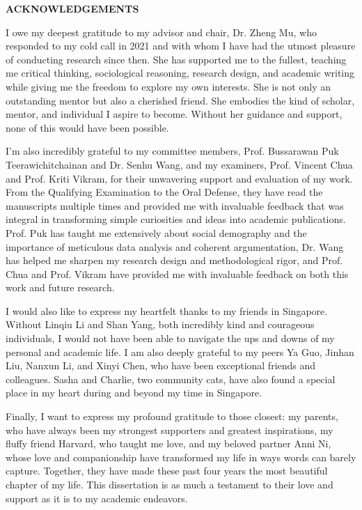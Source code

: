 \begin{center}
    {\large \textbf{ACKNOWLEDGEMENTS}}
\end{center}

\thispagestyle{plain}

I owe my deepest gratitude to my advisor and chair, Dr. Zheng Mu, who responded to my cold call in 2021 and with whom I have had the utmost pleasure of conducting research since then. She has supported me to the fullest, teaching me critical thinking, sociological reasoning, research design, and academic writing while giving me the freedom to explore my own interests. She is not only an outstanding mentor but also a cherished friend. She embodies the kind of scholar, mentor, and individual I aspire to become. Without her guidance and support, none of this would have been possible.

I'm also incredibly grateful to my committee members, Prof. Bussarawan Puk Teerawichitchainan and Dr. Senhu Wang, and my examiners, Prof. Vincent Chua and Prof. Kriti Vikram, for their unwavering support and evaluation of my work. From the Qualifying Examination to the Oral Defense, they have read the manuscripts multiple times and provided me with invaluable feedback that was integral in transforming simple curiosities and ideas into academic publications. Prof. Puk has taught me extensively about social demography and the importance of meticulous data analysis and coherent argumentation, Dr. Wang has helped me sharpen my research design and methodological rigor, and Prof. Chua and Prof. Vikram have provided me with invaluable feedback on both this work and future research.

I would also like to express my heartfelt thanks to my friends in Singapore. Without Linqiu Li and Shan Yang, both incredibly kind and courageous individuals, I would not have been able to navigate the ups and downs of my personal and academic life. I am also deeply grateful to my peers Ya Guo, Jinhan Liu, Nanxun Li, and Xinyi Chen, who have been exceptional friends and colleagues. Sasha and Charlie, two community cats, have also found a special place in my heart during and beyond my time in Singapore.

Finally, I want to express my profound gratitude to those closest: my parents, who have always been my strongest supporters and greatest inspirations, my fluffy friend Harvard, who taught me love, and my beloved partner Anni Ni, whose love and companionship have transformed my life in ways words can barely capture. Together, they have made these past four years the most beautiful chapter of my life. This dissertation is as much a testament to their love and support as it is to my academic endeavors.

\clearpage